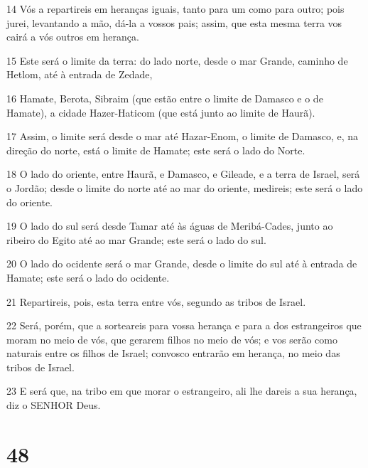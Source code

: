 \par 14 Vós a repartireis em heranças iguais, tanto para um como para outro; pois jurei, levantando a mão, dá-la a vossos pais; assim, que esta mesma terra vos cairá a vós outros em herança.
\par 15 Este será o limite da terra: do lado norte, desde o mar Grande, caminho de Hetlom, até à entrada de Zedade,
\par 16 Hamate, Berota, Sibraim (que estão entre o limite de Damasco e o de Hamate), a cidade Hazer-Haticom (que está junto ao limite de Haurã).
\par 17 Assim, o limite será desde o mar até Hazar-Enom, o limite de Damasco, e, na direção do norte, está o limite de Hamate; este será o lado do Norte.
\par 18 O lado do oriente, entre Haurã, e Damasco, e Gileade, e a terra de Israel, será o Jordão; desde o limite do norte até ao mar do oriente, medireis; este será o lado do oriente.
\par 19 O lado do sul será desde Tamar até às águas de Meribá-Cades, junto ao ribeiro do Egito até ao mar Grande; este será o lado do sul.
\par 20 O lado do ocidente será o mar Grande, desde o limite do sul até à entrada de Hamate; este será o lado do ocidente.
\par 21 Repartireis, pois, esta terra entre vós, segundo as tribos de Israel.
\par 22 Será, porém, que a sorteareis para vossa herança e para a dos estrangeiros que moram no meio de vós, que gerarem filhos no meio de vós; e vos serão como naturais entre os filhos de Israel; convosco entrarão em herança, no meio das tribos de Israel.
\par 23 E será que, na tribo em que morar o estrangeiro, ali lhe dareis a sua herança, diz o SENHOR Deus.

\chapter{48}

